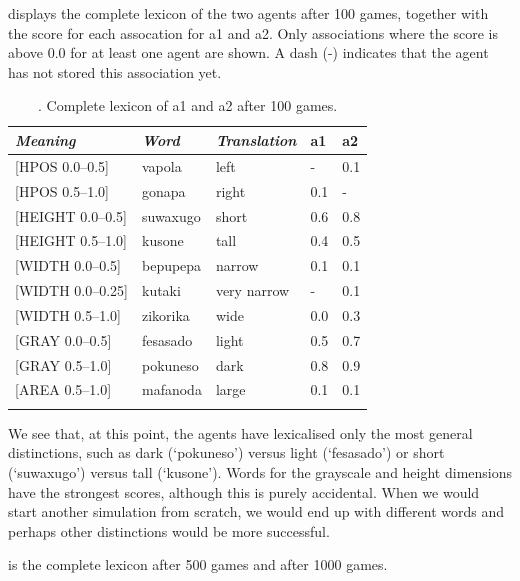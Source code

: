  displays the complete lexicon of the two agents after 100 games, 
together with the score for each assocation for 
{\bfshape  a1} and {\bfshape  a2}. Only associations where the 
score is above 0.0 for at least one agent are shown. 
A dash (-) indicates that the agent has not stored 
this association yet. 


\begin{table}
\begin{center}
\begin{tabular}{ l  l  l  l  l }
\lsptoprule
{\itshape Meaning}&{\itshape Word}&{\itshape Translation} & {\bfshape  a1}&{\bfshape  a2} \\ \midrule
{}[HPOS 0.0–0.5] & vapola&left&-&0.1\\ 
{}[HPOS 0.5–1.0]& gonapa&right &0.1&-\\ 
{}[HEIGHT 0.0–0.5]&suwaxugo&short &0.6&0.8\\ 
{}[HEIGHT 0.5–1.0]& kusone&tall &0.4&0.5\\ 
{}[WIDTH 0.0–0.5]&bepupepa&narrow &0.1&0.1\\ 
{}[WIDTH 0.0–0.25]&kutaki&very narrow &-&0.1\\ 
{}[WIDTH 0.5–1.0]& zikorika&wide &0.0&0.3\\ 
{}[GRAY 0.0–0.5]& fesasado&light &0.5&0.7\\ 
{}[GRAY 0.5–1.0]& pokuneso&dark &0.8&0.9\\ 
{}[AREA 0.5–1.0]& mafanoda&large &0.1&0.1\\ 
\lspbottomrule
\end{tabular}
\caption{\label{tab:lex100}. Complete lexicon of {\bfshape  a1} and {\bfshape  a2} after 100 games.}
\end{center}
\end{table}
We see that, at this point, the agents have lexicalised 
only the most general distinctions, such as dark (`pokuneso') 
versus light (`fesasado') or short (`suwaxugo') versus tall 
(`kusone'). Words for the grayscale and height dimensions
have the strongest scores, although this is purely accidental. 
When we would start another simulation from scratch,
we would end up with different words and perhaps 
other distinctions would be more successful. 

 is the complete lexicon after 500 games and  after 1000 games. 


